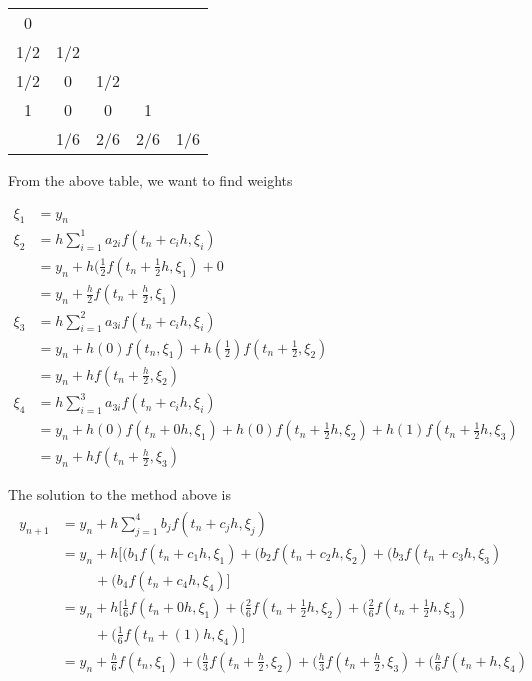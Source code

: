 \documentclass[12pt,a4paper]{article}
\begin{document}
\begin{center}
\begin{tabular}{c|cccc}
0\\
1/2&1/2\\
1/2&0&1/2\\
1&0&0&1\\
\hline
&1/6&2/6&2/6&1/6
\end{tabular}
\end{center}

\noindent
From the above table, we want to find weights 

\begin{align*}
\xi_1 &= y_n \\
\xi_2 &= h \sum_{i=1}^{1}a_{2i}f(t_n + c_ih , \xi_i ) \\
&= y_n + h (\frac{1}{2}f(t_n + \frac{1}{2}h, \xi_1) + 0 \\
&= y_n + \frac{h}{2}f(t_n + \frac{h}{2}, \xi_1) \\
\xi_3 &= h \sum_{i=1}^{2}a_{3i}f(t_n + c_ih , \xi_i ) \\
&= y_n + h (0) f(t_n,\xi_1) + h (\frac{1}{2})f(t_n + \frac{1}{2}, \xi_2) \\
&= y_n + h f(t_n + \frac{h}{2}, \xi_2) \\
\xi_4 &= h \sum_{i=1}^{3}a_{3i}f(t_n + c_ih , \xi_i ) \\
&= y_n + h (0) f(t_n + 0h ,\xi_1) + h(0)f(t_n + \frac{1}{2}h ,\xi_2) + h(1)f(t_n + \frac{1}{2}h ,\xi_3) \\
&= y_n + h f(t_n + \frac{h}{2}, \xi_3) 
\end{align*}

The solution to the method above is 
\begin{align*}
\begin{split}
y_{n+1}  &= y_n + h \sum_{j=1}^{4}b_jf(t_n + c_jh , \xi_j )\\
&= y_n + h [(b_1f(t_n + c_1h , \xi_1 ) + (b_2f(t_n + c_2h , \xi_2 )+ (b_3f(t_n + c_3h , \xi_3 ) \\
&\hspace{1cm}+ (b_4f(t_n + c_4h , \xi_4 )] \\
&= y_n + h [\frac{1}{6} f(t_n + 0h , \xi_1 ) + (\frac{2}{6}f(t_n + \frac{1}{2}h , \xi_2 )+ (\frac{2}{6}f(t_n + \frac{1}{2}h , \xi_3 ) \\
&\hspace{1cm} + (\frac{1}{6}f(t_n + (1)h , \xi_4 )] \\
&= y_n + \frac{h}{6} f(t_n , \xi_1 ) + (\frac{h}{3}f(t_n + \frac{h}{2} , \xi_2 )+ (\frac{h}{3}f(t_n + \frac{h}{2} , \xi_3 )+ (\frac{h}{6}f(t_n + h , \xi_4 )
\end{split} 
\end{align*}
\end{document}
